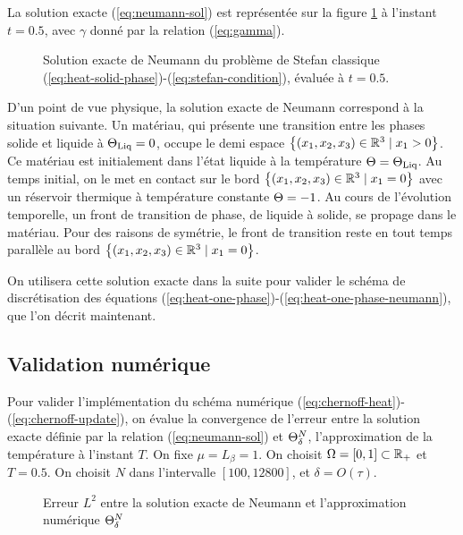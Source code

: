 La solution exacte (\ref{eq:neumann-sol}) est représentée sur la
figure \ref{fig:neumann-sol} à l'instant $t = 0.5$, avec $\gamma$
donné par la relation (\ref{eq:gamma}).

\begin{figure}
  \begin{center}
    
    \caption{Solution exacte de Neumann du problème de Stefan classique
      (\ref{eq:heat-solid-phase})-(\ref{eq:stefan-condition}), évaluée
      à $t = 0.5$.}
    \label{fig:neumann-sol}
  \end{center}
\end{figure}

D'un point de vue physique, la solution exacte de Neumann correspond à
la situation suivante. Un matériau, qui présente une transition entre
les phases solide et liquide à $\Theta_\text{Liq} = 0$, occupe le demi espace
$\left\{ (x_1, x_2, x_3)\in \mathbb R^3 \mid x_1 > 0 \right\}$. Ce matériau
est initialement dans l'état liquide à la température $\Theta =
\Theta_\text{Liq}$. Au temps initial, on le met en contact sur le bord
$\left\{ (x_1, x_2, x_3)\in\mathbb R^3 \mid x_1 = 0 \right\}$ avec un
réservoir thermique à température constante $\Theta = -1$. Au
cours de l'évolution temporelle, un front de transition de phase, de
liquide à solide, se propage dans le matériau. Pour des raisons de
symétrie, le front de transition reste en tout temps parallèle au
bord $\left\{ (x_1, x_2, x_3)\in\mathbb R^3 \mid x_1 = 0 \right\}$.

On utilisera cette solution exacte dans la suite pour valider le schéma de
discrétisation des équations
(\ref{eq:heat-one-phase})-(\ref{eq:heat-one-phase-neumann}), que l'on
décrit maintenant.

\subsection*{Validation numérique}
Pour valider l'implémentation du schéma numérique
(\ref{eq:chernoff-heat})-(\ref{eq:chernoff-update}), on évalue la
convergence de l'erreur entre la solution exacte définie par la
relation (\ref{eq:neumann-sol}) et $\Theta^N_\delta$,
l'approximation de la température à l'instant $T$. On fixe $\mu =
L_\beta = 1$. On choisit $\Omega = [0, 1] \subset \mathbb R_+$ et $T =
0.5$. On choisit $N$ dans l'intervalle $[100, 12800]$, et $\delta =
O(\tau)$.

\begin{figure}
  \begin{center}
    
    \caption{Erreur $L^2$ entre la solution exacte de Neumann et
      l'approximation numérique $\Theta^N_\delta$}
    \label{fig:neumann-convergence}
  \end{center}
\end{figure}

